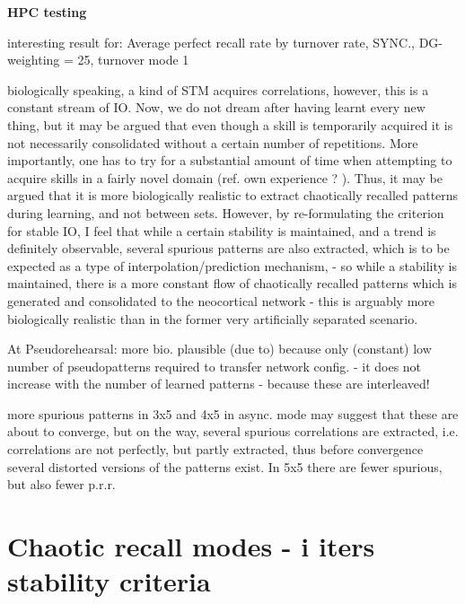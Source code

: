 \textbf{HPC testing}

interesting result for: Average perfect recall rate by turnover rate, SYNC., DG-weighting = 25, turnover mode 1

biologically speaking, a kind of STM acquires correlations, however, this is a constant stream of IO. Now, we do not dream after having learnt every new thing, but it may be argued that even though a skill is temporarily acquired it is not necessarily consolidated without a certain number of repetitions. More importantly, one has to try for a substantial amount of time when attempting to acquire skills in a fairly novel domain (ref. own experience ? ). Thus, it may be argued that it is more biologically realistic to extract chaotically recalled patterns during learning, and not between sets. However, by re-formulating the criterion for stable IO, I feel that while a certain stability is maintained, and a trend is definitely observable, several spurious patterns are also extracted, which is to be expected as a type of interpolation/prediction mechanism, - so while a stability is maintained, there is a more constant flow of chaotically recalled patterns which is generated and consolidated to the neocortical network - this is arguably more biologically realistic than in the former very artificially separated scenario.

At Pseudorehearsal: more bio. plausible (due to) because only (constant) low number of pseudopatterns required to transfer network config. - it does not increase with the number of learned patterns - because these are interleaved!

more spurious patterns in 3x5 and 4x5 in async. mode may suggest that these are about to converge, but on the way, several spurious correlations are extracted, i.e. correlations are not perfectly, but partly extracted, thus before convergence several distorted versions of the patterns exist. In 5x5 there are fewer spurious, but also fewer p.r.r.

\section{Chaotic recall modes - i iters stability criteria}

